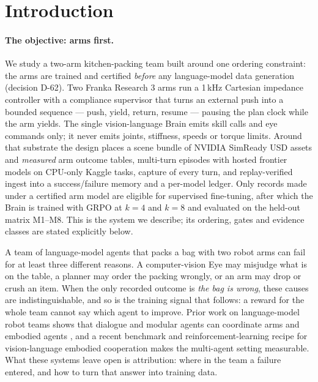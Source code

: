 \section{Introduction}\label{sec:intro}

\paragraph{The objective: arms first.}
We study a two-arm kitchen-packing team built around one ordering constraint: the arms are trained and certified \emph{before} any language-model data generation (decision D-62).
Two Franka Research 3 arms run a 1\,kHz Cartesian impedance controller with a compliance supervisor that turns an external push into a bounded sequence --- push, yield, return, resume --- pausing the plan clock while the arm yields.
The single vision-language Brain emits skill calls and eye commands only; it never emits joints, stiffness, speeds or torque limits.
Around that substrate the design places a scene bundle of NVIDIA SimReady USD assets and \emph{measured} arm outcome tables, multi-turn episodes with hosted frontier models on CPU-only Kaggle tasks, capture of every turn, and replay-verified ingest into a success/failure memory and a per-model ledger.
Only records made under a certified arm model are eligible for supervised fine-tuning, after which the Brain is trained with GRPO at $k=4$ and $k=8$ and evaluated on the held-out matrix M1--M8.
This is the system we describe; its ordering, gates and evidence classes are stated explicitly below.

A team of language-model agents that packs a bag with two robot arms can fail for at least three different reasons.
A computer-vision Eye may misjudge what is on the table, a planner may order the packing wrongly, or an arm may drop or crush an item.
When the only recorded outcome is \emph{the bag is wrong}, these causes are indistinguishable, and so is the training signal that follows: a reward for the whole team cannot say which agent to improve.
Prior work on language-model robot teams shows that dialogue and modular agents can coordinate arms and embodied agents \citep{mandi2024roco,zhang2024coela}, and a recent benchmark and reinforcement-learning recipe for vision-language embodied cooperation \citep{kang2025vikir} makes the multi-agent setting measurable.
What these systems leave open is attribution: where in the team a failure entered, and how to turn that answer into training data.

